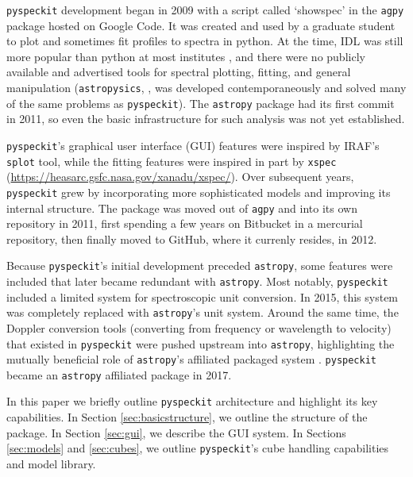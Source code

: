 \documentclass[twocolumn]{aastex62}
\newcommand{\pyspeckit}{\texttt{pyspeckit}\xspace}
\newcommand{\astropy}{\texttt{astropy}\xspace}
\begin{document}
\pyspeckit development began in 2009 with a script called `showspec' in the
\texttt{agpy} package hosted on Google Code. It was created and used by a
graduate student to plot and sometimes fit profiles to spectra in python. At
the time, IDL was still more popular than python at most institutes
\citep[the first evidence
that python had overtaken IDL in popularity among astronomers was presented in
]{Momcheva2015a}, and there were no publicly available and advertised
tools for spectral plotting, fitting, and general manipulation
(\texttt{astropysics}, \citealt{Tollerud2012a}, was developed contemporaneously and
solved many of the same problems as \pyspeckit). The \astropy package
\citep{Astropy-Collaboration2013a,Price-Whelan2018a} had its first commit in
2011, so even the basic infrastructure for such analysis was
not yet established.

\pyspeckit's graphical user interface (GUI) features were inspired by IRAF's
\texttt{splot} tool, while the fitting features were inspired in part by \texttt{xspec}
(\url{https://heasarc.gsfc.nasa.gov/xanadu/xspec/}).  Over subsequent years,
\pyspeckit grew by incorporating more sophisticated models  and improving its
internal structure.  The package was moved out of \texttt{agpy} and into its
own repository in 2011, first spending a few years on Bitbucket in a mercurial
repository, then finally moved to GitHub, where it currenly resides, in 2012.

Because \pyspeckit's initial development preceded \astropy, some features
were included that later became redundant with \astropy.  Most notably, \pyspeckit included
a limited system for spectroscopic unit conversion.  In 2015, this system
was completely replaced with \astropy's unit system.  Around the same time,
the Doppler conversion tools (converting from frequency or wavelength to
velocity) that existed in \pyspeckit were pushed upstream into \astropy,
highlighting the mutually beneficial role of \astropy's affiliated
packaged system \citep{Price-Whelan2018a}.  \pyspeckit became
an \astropy affiliated package in 2017.


In this paper we briefly outline \texttt{pyspeckit} architecture and highlight
its key capabilities. In Section \ref{sec:basicstructure}, we  outline the
structure of the package.  In Section \ref{sec:gui}, we describe the GUI
system.  In Sections \ref{sec:models} and \ref{sec:cubes}, we outline
\pyspeckit's cube handling capabilities and model library. 
\end{document}
